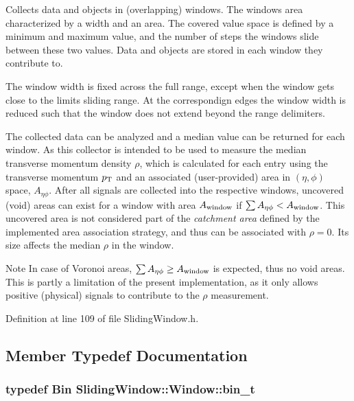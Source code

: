 Collects data and objects in (overlapping) windows. The windows area characterized by a width and an area. The covered value space is defined by a minimum and maximum value, and the number of steps the windows slide between these two values. Data and objects are stored in each window they contribute to.

The window width is fixed across the full range, except when the window gets close to the limits sliding range. At the correspondign edges the window width is reduced such that the window does not extend beyond the range delimiters.

The collected data can be analyzed and a median value can be returned for each window. As this collector is intended to be used to measure the median transverse momentum density $ \rho $, which is calculated for each entry using the transverse momentum $ p_{\rm T} $ and an associated (user-\/provided) area in $ (\eta,\phi) $ space, $ A_{\eta\phi} $. After all signals are collected into the respective windows, uncovered (void) areas can exist for a window with area $ A_{\rm window} $ if $ \sum A_{\eta\phi} < A_{\rm window} $. This uncovered area is not considered part of the {\itshape catchment area} defined by the implemented area association strategy, and thus can be associated with $ \rho = 0 $. Its size affects the median $ \rho $ in the window.

\begin{DoxyNote}{Note}
In case of Voronoi areas, $ \sum A_{\eta\phi} \geq A_{\rm window} $ is expected, thus no void areas. This is partly a limitation of the present implementation, as it only allows positive (physical) signals to contribute to the $ \rho $ measurement. 
\end{DoxyNote}


Definition at line 109 of file Sliding\+Window.\+h.



\subsection{Member Typedef Documentation}
\subsubsection[{\texorpdfstring{bin\+\_\+t}{bin_t}}]{\setlength{\rightskip}{0pt plus 5cm}typedef {\bf Bin} {\bf Sliding\+Window\+::\+Window\+::bin\+\_\+t}}\hypertarget{classSlidingWindow_1_1Window_a9bbfc142a52e17a3e1c51093edfe936f}{}\label{classSlidingWindow_1_1Window_a9bbfc142a52e17a3e1c51093edfe936f}


